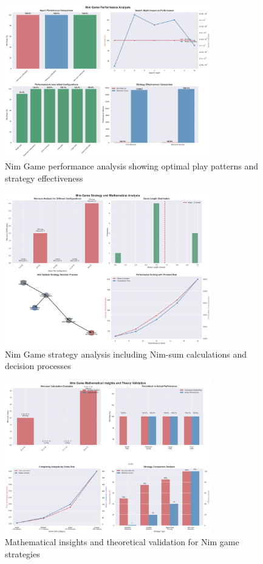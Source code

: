 \documentclass[12pt]{article}
\begin{document}
\begin{figure}[H]
\centering
\includegraphics[width=0.8\textwidth]{output/images/nim_performance_analysis.png}
\caption{Nim Game performance analysis showing optimal play patterns and strategy effectiveness}
\label{fig:nim_performance}
\end{figure}

\begin{figure}[H]
\centering
\includegraphics[width=0.8\textwidth]{output/images/nim_strategy_analysis.png}
\caption{Nim Game strategy analysis including Nim-sum calculations and decision processes}
\label{fig:nim_strategy}
\end{figure}

\begin{figure}[H]
\centering
\includegraphics[width=0.8\textwidth]{output/images/nim_mathematical_insights.png}
\caption{Mathematical insights and theoretical validation for Nim game strategies}
\label{fig:nim_mathematical}
\end{figure}
\end{document}
